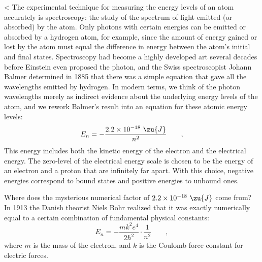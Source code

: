 <%
The experimental technique for measuring the energy levels
of an atom accurately is spectroscopy: the study of the
spectrum of light emitted (or absorbed) by the atom. Only
photons with certain energies can be emitted or absorbed by
a hydrogen atom, for example, since the amount of energy
gained or lost by the atom must equal the difference in
energy between the atom's initial and final states.
Spectroscopy had become a highly developed art
several decades before Einstein even proposed the photon,
and the Swiss spectroscopist Johann Balmer
determined in 1885 that there was a simple equation that
gave all the wavelengths emitted by hydrogen. In modern
terms, we think of the photon wavelengths merely as indirect
evidence about the underlying energy levels of the atom, and
we rework Balmer's result into an equation for these
atomic energy levels:
\begin{equation*}
                E_n    =  -\frac{2.2\times10^{-18}\ \zu{J}}{n^2}     \qquad   ,  
\end{equation*}
This energy includes both
the kinetic energy of the electron and the electrical
energy. The zero-level of the electrical energy
scale is chosen to be the energy of an electron and a proton
that are infinitely far apart. With this choice, negative
energies correspond to bound states and positive energies to unbound ones.

Where does the mysterious numerical factor of $2.2\times10^{-18}\ \zu{J}$
come from? In 1913 the Danish theorist Niels Bohr
realized that it was exactly numerically equal to a certain
combination of fundamental physical constants:
\begin{equation*}
 E_n = -\frac{mk^2e^4}{2\hbar^2}\cdot\frac{1}{n^2}     \qquad   ,  
\end{equation*}
where $m$ is the mass of the electron,  and $k$ is the Coulomb
force constant for electric forces.

